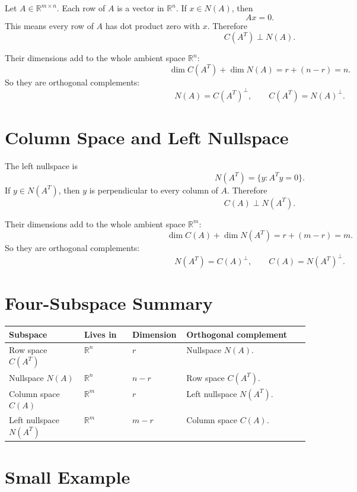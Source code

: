 \documentclass[10pt]{article}
\begin{document}
Let \(A\in\mathbb{R}^{m\times n}\). Each row of \(A\) is a vector in \(\mathbb{R}^n\). If \(x\in N(A)\), then
\[
Ax=0.
\]
This means every row of \(A\) has dot product zero with \(x\). Therefore
\[
C(A^{T})\perp N(A).
\]

Their dimensions add to the whole ambient space \(\mathbb{R}^n\):
\[
\dim C(A^{T})+\dim N(A)=r+(n-r)=n.
\]
So they are orthogonal complements:
\[
N(A)=C(A^{T})^{\perp},
\qquad
C(A^{T})=N(A)^{\perp}.
\]

\section{Column Space and Left Nullspace}

The left nullspace is
\[
N(A^{T})=\{y:A^{T}y=0\}.
\]
If \(y\in N(A^{T})\), then \(y\) is perpendicular to every column of \(A\). Therefore
\[
C(A)\perp N(A^{T}).
\]

Their dimensions add to the whole ambient space \(\mathbb{R}^m\):
\[
\dim C(A)+\dim N(A^{T})=r+(m-r)=m.
\]
So they are orthogonal complements:
\[
N(A^{T})=C(A)^{\perp},
\qquad
C(A)=N(A^{T})^{\perp}.
\]

\section{Four-Subspace Summary}

\begin{center}
\small
\begin{tabularx}{\linewidth}{@{}L{0.25\linewidth}L{0.16\linewidth}L{0.18\linewidth}Y@{}}
\toprule
Subspace & Lives in & Dimension & Orthogonal complement \\
\midrule
Row space \(C(A^{T})\) & \(\mathbb{R}^n\) & \(r\) & Nullspace \(N(A)\). \\
Nullspace \(N(A)\) & \(\mathbb{R}^n\) & \(n-r\) & Row space \(C(A^{T})\). \\
Column space \(C(A)\) & \(\mathbb{R}^m\) & \(r\) & Left nullspace \(N(A^{T})\). \\
Left nullspace \(N(A^{T})\) & \(\mathbb{R}^m\) & \(m-r\) & Column space \(C(A)\). \\
\bottomrule
\end{tabularx}
\end{center}


\section{Small Example}
\end{document}
